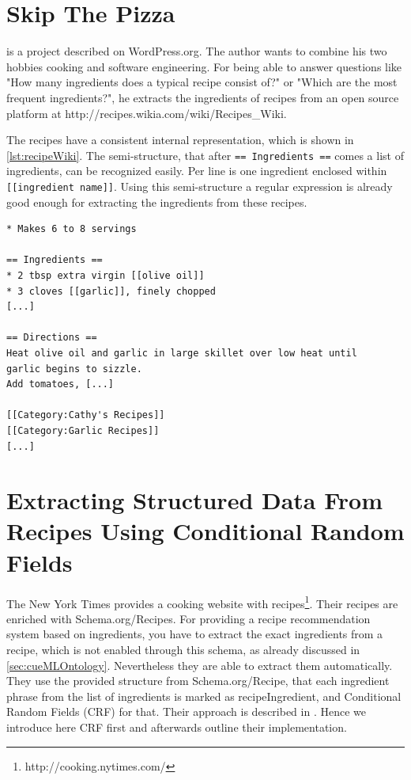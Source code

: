 \documentclass[12pt, twoside]{report}
\begin{document}
\section{Skip The Pizza}
\parencite{REgutGenug} is a project described on WordPress.org. The author wants to combine his two hobbies cooking and software engineering. For being able to answer questions like "How many ingredients does a typical recipe consist of?" or "Which are the most frequent ingredients?", he extracts the ingredients of recipes from an open source platform at http://recipes.wikia.com/wiki/Recipes\_Wiki.

The recipes have a consistent internal representation, which is shown in \cref{lst:recipeWiki}. The semi-structure, that after \texttt{== Ingredients ==} comes a list of ingredients, can be recognized easily. Per line is one ingredient enclosed within \texttt{[[ingredient name]]}. Using this semi-structure a regular expression is already good enough for extracting the ingredients from these recipes.

\begin{lstlisting}[frame=single, basicstyle=\footnotesize\ttfamily,caption={Shortened example recipe from \\ http://recipes.wikia.com/wiki/Recipes\_Wiki}, label=lst:recipeWiki]
* Makes 6 to 8 servings

== Ingredients ==
* 2 tbsp extra virgin [[olive oil]]
* 3 cloves [[garlic]], finely chopped
[...]

== Directions ==
Heat olive oil and garlic in large skillet over low heat until
garlic begins to sizzle.
Add tomatoes, [...]

[[Category:Cathy's Recipes]]
[[Category:Garlic Recipes]]
[...]
\end{lstlisting}


\section{Extracting Structured Data From Recipes Using Conditional Random Fields}\label{sec:crfzeit}
The New York Times provides a cooking website with recipes\footnote{http://cooking.nytimes.com/}. Their recipes are enriched with Schema.org/Recipes. For providing a recipe recommendation system based on ingredients, you have to extract the exact ingredients from a recipe, which is not enabled through this schema, as already discussed in \cref{sec:cueMLOntology}. Nevertheless they are able to extract them automatically. They use the provided structure from Schema.org/Recipe, that each ingredient phrase from the list of ingredients is marked as recipeIngredient, and Conditional Random Fields (CRF) for that. Their approach is described in \parencite{CRFZeit}. Hence we introduce here CRF first and afterwards outline their implementation.  
\end{document}
